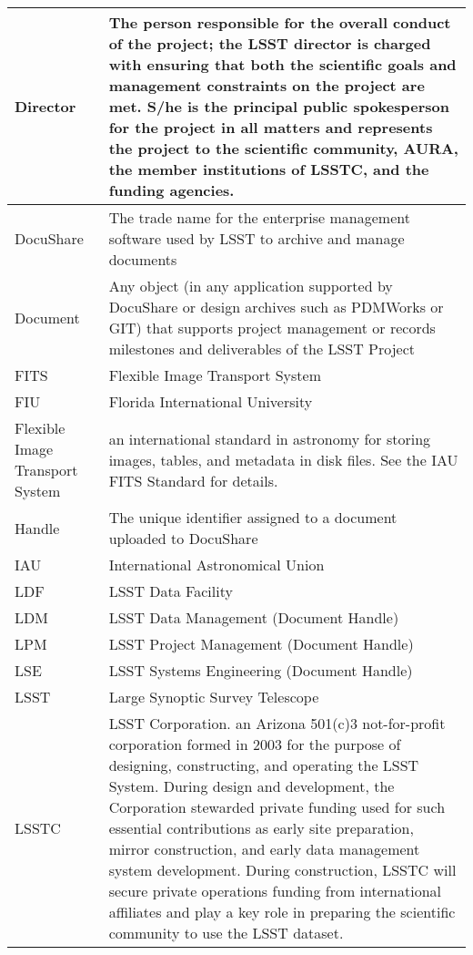 \begin{longtable}{|l|p{}|}
Director & The person responsible for the overall conduct of the project; the \gls{LSST} director is charged with ensuring that both the scientific goals and management constraints on the project are met. S/he is the principal public spokesperson for the project in all matters and represents the project to the scientific community, \gls{AURA}, the member institutions of \gls{LSSTC}, and the funding agencies. \\\hline
DocuShare & The trade name for the enterprise management software used by \gls{LSST} to archive and manage documents \\\hline
Document & Any object (in any application supported by \gls{DocuShare} or design archives such as PDMWorks or GIT) that supports project management or records milestones and deliverables of the \gls{LSST} Project \\\hline
FITS & \gls{Flexible Image Transport System} \\\hline
FIU & Florida International University \\\hline
Flexible Image Transport System & an international standard in astronomy for storing images, tables, and \gls{metadata} in disk files. See the \gls{IAU} \gls{FITS} Standard for details. \\\hline
Handle & The unique identifier assigned to a document uploaded to \gls{DocuShare} \\\hline
IAU & International Astronomical Union \\\hline
LDF & \gls{LSST} Data Facility \\\hline
LDM & \gls{LSST} \gls{Data Management} (\gls{Document} \gls{Handle}) \\\hline
LPM & \gls{LSST} Project Management (\gls{Document} \gls{Handle}) \\\hline
LSE & \gls{LSST} \gls{Systems Engineering} (\gls{Document} \gls{Handle}) \\\hline
LSST & Large Synoptic Survey Telescope \\\hline
LSSTC & \gls{LSST} Corporation. an Arizona 501(c)3 not-for-profit corporation formed in 2003 for the purpose of designing, constructing, and operating the \gls{LSST} System. During design and development, the Corporation stewarded private funding used for such essential contributions as early site preparation, mirror construction, and early data management system development. During construction, \gls{LSSTC} will secure private operations funding from international affiliates and play a key role in preparing the scientific community to use the \gls{LSST} dataset. \\\hline

\end{longtable}
